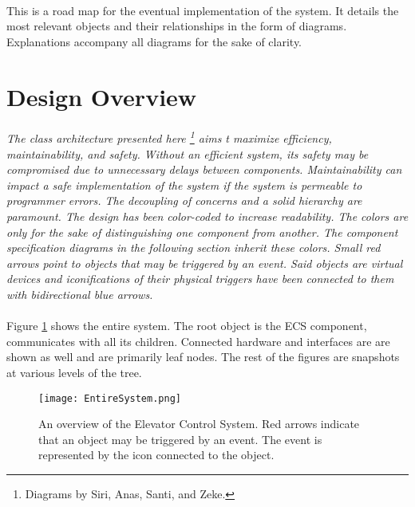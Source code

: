\documentclass[12pt]{article}
\begin{document}
\paragraph{} This is a road map for the eventual implementation of the system. It details the most relevant objects 
and their relationships in the form of diagrams. Explanations accompany all diagrams for the sake of clarity.

\section{Design Overview} \label{over} %
	\paragraph{} \textit{The class architecture presented here \footnote{ Diagrams by Siri, Anas, Santi, and Zeke.}
	aims t maximize efficiency, maintainability, and safety. Without an efficient system, its safety may be compromised 
	due to unnecessary delays between components. Maintainability can impact a safe implementation of the system 
	if the system is permeable to programmer errors. The decoupling of concerns and a solid hierarchy are paramount. 
    The design has been color-coded to increase readability. The colors are only for the sake of distinguishing one 
	component from another. The component specification diagrams in the following section inherit these colors. Small 
	red arrows point to objects that may be triggered by an event. Said objects are virtual devices and iconifications
	of their physical triggers have been connected to them with bidirectional blue arrows.} 

	\paragraph{} Figure \ref{fig:EntireSystem} shows the entire system. The root object is the ECS component, 
	communicates with all its children. Connected hardware and interfaces are are shown as well and are primarily leaf nodes.
	The rest of the figures are snapshots at various levels of the tree.

    \begin{figure}[H]
  		\centerline{\texttt{[image: EntireSystem.png]}}
  		\caption{An overview of the Elevator Control System. Red arrows indicate that an object may be triggered by an event. The
  		event is represented by the icon connected to the object.}
  		\label{fig:EntireSystem}
	\end{figure}	
	
\end{document}
